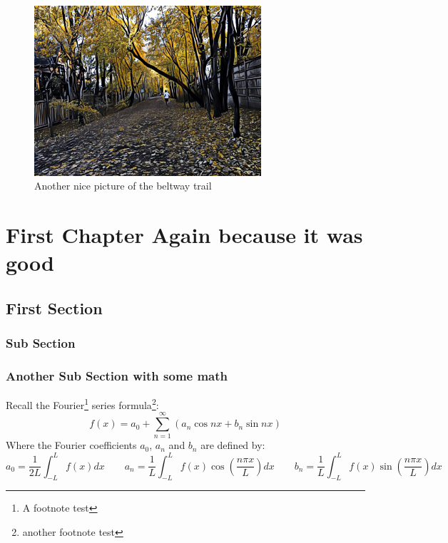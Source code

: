 \documentclass[11pt,letterpaper,twoside]{book}
\begin{document}
\lipsum[95]
\begin{figure}
\centering
\includegraphics[width=0.75\textwidth]{TrailPic2}
\caption{\label{fig:pathB}Another nice picture of the beltway trail}
\end{figure}

\lipsum[10-11]


\chapter{First Chapter Again because it was good}

\lipsum[11-14]

\section{First Section}

\lipsum[63]

\subsection{Sub Section}

\lipsum[41-45]

\subsection{Another Sub Section with some math}

\lipsum[16-17]
Recall the Fourier\footnote{A footnote test} series formula\footnote{another footnote test \lipsum[1]}:
\[
f(x) = a_0 + \sum_{n = 1}^\infty \left( a_n \cos nx + b_n \sin nx \right)
\]
Where the Fourier coefficients $a_0$, $a_n$ and $b_n$ are defined by:
\[
a_0 = \frac{1}{2L} \int_{-L}^L f(x) dx  \qquad
a_n = \frac{1}{L}  \int_{-L}^L f(x) \cos \left( \frac{n\pi x}{L} \right) dx \qquad
b_n = \frac{1}{L}  \int_{-L}^L f(x) \sin \left( \frac{n\pi x}{L} \right) dx 
\]
\lipsum[88]
\end{document}
